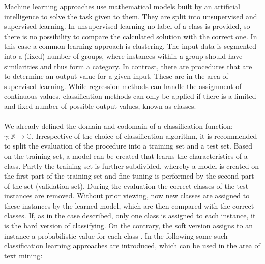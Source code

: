 \documentclass[article,type=msc,colorback,accentcolor=tud7b]{tudthesis}
\begin{document}
    
    Machine learning approaches use mathematical models built by an artificial intelligence to solve the task given to them. They are split into unsupervised and supervised learning. In unsupervised learning no label of a class is provided, so there is no possibility to compare the calculated solution with the correct one. In this case a common learning approach is clustering. The input data is segmented into a (fixed) number of groups, where instances within a group should have similarities and thus form a category. In contrast, there are procedures that are to determine an output value for a given input. These are in the area of supervised learning. While regression methods can handle the assignment of continuous values, classification methods can only be applied if there is a limited and fixed number of possible output values, known as classes. \\\\
    We already defined the domain and codomain of a classification function: $\gamma:\mathbb{X}\rightarrow\mathbb{C}$. Irrespective of the choice of classification algorithm, it is recommended to split the evaluation of the procedure into a training set and a test set. Based on the training set, a model can be created that learns the characteristics of a class. Partly the training set is further subdivided, whereby a model is created on the first part of the training set and fine-tuning is performed by the second part of the set (validation set). During the evaluation the correct classes of the test instances are removed. Without prior viewing, now new classes are assigned to these instances by the learned model, which are then compared with the correct classes. If, as in the case described, only one class is assigned to each instance, it is the hard version of classifying. On the contrary, the soft version assigns to an instance a probabilistic value for each class \autocite{Aggarwal2012}. In the following some such classification learning approaches are introduced, which can be used in the area of text mining:
\end{document}
